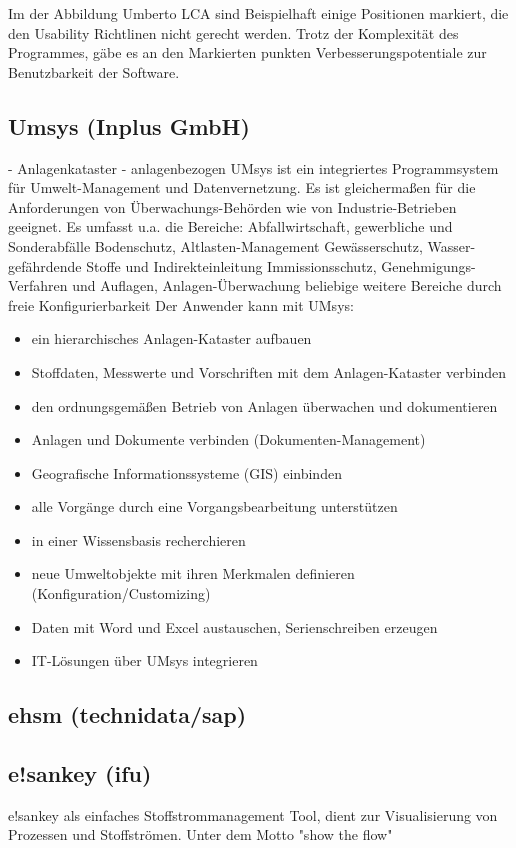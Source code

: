 \documentclass[a4paper, 12pt, twoside, BCOR=20mm, DIV=calc, abstracton, parskip=half*, toc=bibliography, toc=listof, headsepline, footsepline, headings=small, numbers=enddot]{scrreprt}
\begin{document}
Im der Abbildung Umberto LCA sind Beispielhaft einige Positionen markiert, die den Usability Richtlinen nicht gerecht werden. 
Trotz der Komplexität des Programmes, gäbe es an den Markierten punkten Verbesserungspotentiale zur Benutzbarkeit der Software. 


\subsection{Umsys (Inplus GmbH)}
- Anlagenkataster
- anlagenbezogen
%
UMsys ist ein integriertes Programmsystem für Umwelt-Management und Datenvernetzung. Es ist gleichermaßen für die Anforderungen von Überwachungs-Behörden wie von Industrie-Betrieben geeignet. Es umfasst u.a. die Bereiche:
	Abfallwirtschaft, gewerbliche und Sonderabfälle
	Bodenschutz, Altlasten-Management
	Gewässerschutz, Wasser-gefährdende Stoffe und Indirekteinleitung
	Immissionsschutz, Genehmigungs-Verfahren und Auflagen, Anlagen-Überwachung
	beliebige weitere Bereiche durch freie Konfigurierbarkeit
Der Anwender kann mit UMsys:
\begin{itemize}
\item	ein hierarchisches Anlagen-Kataster aufbauen
\item		Stoffdaten, Messwerte und Vorschriften mit dem Anlagen-Kataster verbinden
\item	den ordnungsgemäßen Betrieb von Anlagen überwachen und dokumentieren
\item		Anlagen und Dokumente verbinden (Dokumenten-Management)
\item	Geografische Informationssysteme (GIS) einbinden
\item		alle Vorgänge durch eine Vorgangsbearbeitung unterstützen
\item		in einer Wissensbasis recherchieren
\item		neue Umweltobjekte mit ihren Merkmalen definieren (Konfiguration/Customizing)
\item		Daten mit Word und Excel austauschen, Serienschreiben erzeugen
\item		IT-Lösungen über UMsys integrieren
\end{itemize}

\subsection{ehsm (technidata/sap)}

\subsection{e!sankey (ifu)}
e!sankey als einfaches Stoffstrommanagement Tool, dient zur Visualisierung von Prozessen und Stoffströmen. Unter dem Motto "show the flow" 
\end{document}
